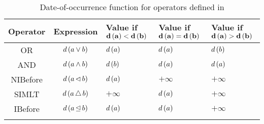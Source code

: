 \documentclass[12pt,openright,twoside,a4paper,oldfontcommands,english,brazil,draft]{abntex2}
\theoremstyle{theo}
\newcommand{\func}[2]{\ensuremath #1 \left( #2 \right)}
\def\nibefore{\ensuremath\operatorname{\lhd}}
\def\ibefore{\ensuremath\operatorname{\unlhd}}
\def\simultaneous{\ensuremath\operatorname{\bigtriangleup}}
\begin{document}
\begin{table}
  \caption{Date-of-occurrence function for operators defined in \cite{Merle2010}}
  \label{tbl:date-of-occurrence-for-operators}
  \centering
  \begin{tabularx}{\textwidth}{ccXXX}
    \hline\noalign{\smallskip}
    \textbf{Operator} &
      \textbf{Expression} &
      \textbf{Value if \smallskip\smallskip} $\mathbf{\func{d}{a} < \func{d}{b}}$ &
      \textbf{Value if \smallskip\smallskip} $\mathbf{\func{d}{a} = \func{d}{b}}$ &
      \textbf{Value if \smallskip\smallskip} $\mathbf{\func{d}{a} > \func{d}{b}}$\\
    \hline\noalign{\smallskip}\hline\noalign{\smallskip}
    \ac{OR} &
      $\func{d}{a \lor b}$ & $\func{d}{a}$ & $\func{d}{a}$ & $\func{d}{b}$\\
    \ac{AND} &
      $\func{d}{a \land b}$ & $\func{d}{b}$ & $\func{d}{a}$ & $\func{d}{a}$\\
    \ac{NIBefore} &
      $\func{d}{a \nibefore b}$ & $\func{d}{a}$ & $+\infty$ & $+\infty$\\
    \ac{SIMLT} &
      $\func{d}{a \simultaneous b}$ & $+\infty$ & $\func{d}{a}$ & $+\infty$\\
    \ac{IBefore} &
      $\func{d}{a \ibefore b}$ & $\func{d}{a}$ & $\func{d}{a}$ & $+\infty$\\
    \hline\noalign{\smallskip}
  \end{tabularx}

\end{table}

\end{document}
